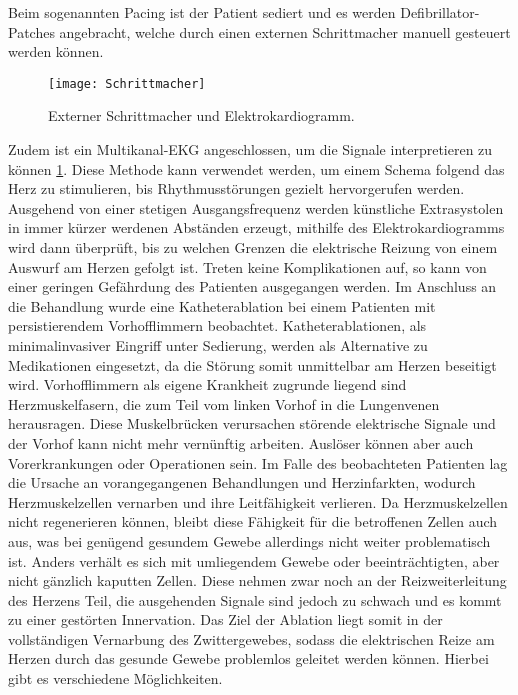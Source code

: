     Beim sogenannten Pacing ist der Patient sediert und es werden Defibrillator-Patches angebracht, welche durch einen externen Schrittmacher
    manuell gesteuert werden können.
    \begin{figure}
        \centering
        \caption{Externer Schrittmacher und Elektrokardiogramm.}
        \label{pacing}
        \texttt{[image: Schrittmacher]}
        \centering
        \end{figure}
    Zudem ist ein Multikanal-EKG angeschlossen, um die Signale interpretieren zu können \ref{pacing}.
    Diese Methode kann verwendet werden, um einem Schema folgend das Herz zu stimulieren, bis Rhythmusstörungen gezielt hervorgerufen werden.
    Ausgehend von einer stetigen Ausgangsfrequenz werden künstliche Extrasystolen in immer kürzer werdenen Abständen erzeugt,
    mithilfe des Elektrokardiogramms wird dann überprüft, bis zu welchen Grenzen die elektrische Reizung von einem Auswurf
    am Herzen gefolgt ist.
    Treten keine Komplikationen auf, so kann von einer geringen Gefährdung des Patienten ausgegangen werden.
    Im Anschluss an die Behandlung wurde eine Katheterablation bei einem Patienten mit persistierendem Vorhofflimmern beobachtet.
    Katheterablationen, als minimalinvasiver Eingriff unter Sedierung, werden als Alternative zu Medikationen eingesetzt,
    da die Störung somit unmittelbar am Herzen beseitigt wird.
    Vorhofflimmern als eigene Krankheit zugrunde liegend sind Herzmuskelfasern, die zum Teil vom linken Vorhof in die Lungenvenen herausragen.
    Diese Muskelbrücken verursachen störende elektrische Signale und der Vorhof kann nicht mehr vernünftig arbeiten.
    Auslöser können aber auch Vorerkrankungen oder Operationen sein.
    Im Falle des beobachteten Patienten lag die Ursache an vorangegangenen Behandlungen und Herzinfarkten, wodurch Herzmuskelzellen
    vernarben und ihre Leitfähigkeit verlieren.
    Da Herzmuskelzellen nicht regenerieren können, bleibt diese Fähigkeit für die betroffenen Zellen auch aus, was bei genügend gesundem Gewebe allerdings nicht weiter problematisch ist.
    Anders verhält es sich mit umliegendem Gewebe oder beeinträchtigten, aber nicht gänzlich kaputten Zellen.
    Diese nehmen zwar noch an der Reizweiterleitung des Herzens Teil, die ausgehenden Signale sind jedoch zu schwach und es kommt zu einer gestörten Innervation.
    Das Ziel der Ablation liegt somit in der vollständigen Vernarbung des Zwittergewebes, sodass die elektrischen Reize am Herzen durch das gesunde Gewebe problemlos geleitet werden können.
    Hierbei gibt es verschiedene Möglichkeiten.
